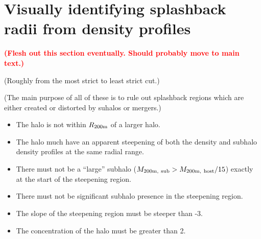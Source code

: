 \documentclass[numberedappendix,apj]{emulateapj}
\begin{document}
\section{Visually identifying splashback radii from density profiles}
\label{sec:visual}

\textcolor{red}{\textbf{(Flesh out this section eventually. Should probably
move to main text.)}}

(Roughly from the most strict to least strict cut.)

(The main purpose of all of these is to rule out splashback regions which are
either created or distorted by suhalos or mergers.)

\begin{itemize}
        \item The halo is not within $R_{\rm 200m}$ of a larger halo.
        \item The halo much have an apparent steepening of both the density
        and subhalo density profiles at the same radial range.
        \item There must not be a ``large'' subhalo
        ($M_{\rm 200m,\ sub} > M_{\rm 200m,\ host}/15$) exactly at the start of
        the steepening region.
        \item There must not be significant subhalo presence in the steepening
        region.
        \item The slope of the steepening region must be steeper than -3.
        \item The concentration of the halo must be greater than 2.
\end{itemize}
\end{document}
